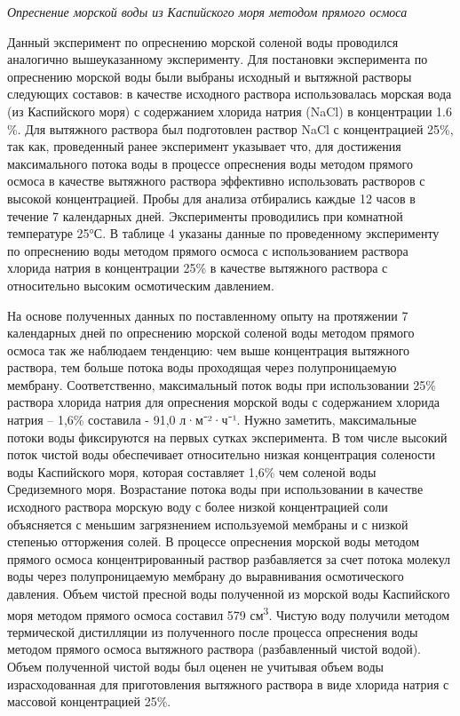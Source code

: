 \begin{multicols}{2}
\emph{Опреснение морской воды из Каспийского моря методом прямого
осмоса}

Данный эксперимент по опреснению морской соленой воды проводился
аналогично вышеуказанному эксперименту. Для постановки эксперимента по
опреснению морской воды были выбраны исходный и вытяжной растворы
следующих составов: в качестве исходного раствора использовалась морская
вода (из Каспийского моря) с содержанием хлорида натрия (NaCl) в
концентрации 1.6 \%. Для вытяжного раствора был подготовлен раствор NaCl
с концентрацией 25\%, так как, проведенный ранее эксперимент указывает
что, для достижения максимального потока воды в процессе опреснения воды
методом прямого осмоса в качестве вытяжного раствора эффективно
использовать растворов с высокой концентрацией. Пробы для анализа
отбирались каждые 12 часов в течение 7 календарных дней. Эксперименты
проводились при комнатной температуре 25°С. В таблице 4 указаны данные
по проведенному эксперименту по опреснению воды методом прямого осмоса с
использованием раствора хлорида натрия в концентрации 25\% в качестве
вытяжного раствора с относительно высоким осмотическим давлением.

На основе полученных данных по поставленному опыту на протяжении 7
календарных дней по опреснению морской соленой воды методом прямого
осмоса так же наблюдаем тенденцию: чем выше концентрация вытяжного
раствора, тем больше потока воды проходящая через полупроницаемую
мембрану. Соответственно, максимальный поток воды при использовании 25\%
раствора хлорида натрия для опреснения морской воды с содержанием
хлорида натрия -- 1,6\% составила - 91,0 л·м⁻²·ч⁻¹. Нужно заметить,
максимальные потоки воды фиксируются на первых сутках эксперимента. В
том числе высокий поток чистой воды обеспечивает относительно низкая
концентрация солености воды Каспийского моря, которая составляет 1,6\%
чем соленой воды Средиземного моря. Возрастание потока воды при
использовании в качестве исходного раствора морскую воду с более низкой
концентрацией соли объясняется с меньшим загрязнением используемой
мембраны и с низкой степенью отторжения солей. В процессе опреснения
морской воды методом прямого осмоса концентрированный раствор
разбавляется за счет потока молекул воды через полупроницаемую мембрану
до выравнивания осмотического давления. Объем чистой пресной воды
полученной из морской воды Каспийского моря методом прямого осмоса
составил 579 см\textsuperscript{3}. Чистую воду получили методом
термической дистилляции из полученного после процесса опреснения воды
методом прямого осмоса вытяжного раствора (разбавленный чистой водой).
Объем полученной чистой воды был оценен не учитывая объем воды
израсходованная для приготовления вытяжного раствора в виде хлорида
натрия с массовой концентрацией 25\%.


\end{multicols}
